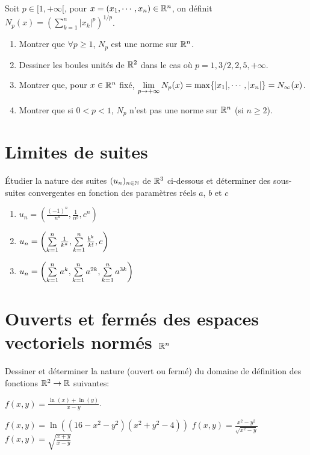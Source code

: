 \documentclass{tp_um}
\begin{document}
\newpage

%
%
Soit $p\in [1,+\infty[$, pour $x=(x_1,\cdots,x_n) \in \mathbb{R}^n$, on définit $N_p(x)=(\sum_{k=1}^n|x_k|^p)^{1/p}$.
\begin{enumerate}
	\item Montrer que $\forall p \geq 1$, $N_p$ est une norme sur $\mathbb{R}^n$.
	\item Dessiner les boules unités de $\mathbb{R}^2$ dans le cas où $p =1,3/2,2, 5,+\infty$.
	\item Montrer que, pour $x\in\mathbb{R}^n$ fixé, $\lim_{p\to+\infty} \limits N_p(x)=\max \{|x_1|,\cdots,\left\lvert x_n\right\rvert\}=N_\infty(x)$.
	\item Montrer que si $0<p<1$, $N_p$ n'est pas une norme sur $\mathbb{R}^n$ (si $n \geq 2$). 
\end{enumerate}


\newpage


\section{Limites de suites}

\exo{} Étudier la nature des suites $(u_{n})_{n\in\mathbb{N}}$ de $\mathbb{R}^3$ ci-dessous et déterminer des sous-suites convergentes en fonction des paramètres réels $a$, $b$ et $c$ 
\begin{enumerate}
	\item $u_n = \left( \frac{(-1)^n}{n^a}, \frac{1}{n^b}, c^n \right)$
	\item $u_n = \left( \sum_{k=1}^n\limits \frac{1}{k^a}, \sum_{k=1}^n\limits \frac{b^k}{k!},c \right)$
	\item $u_n = \left( \sum_{k=1}^n\limits a^k, \sum_{k=1}^n\limits a^{2k},\sum_{k=1}^n\limits a^{3k}  \right) $
\end{enumerate}

\section{Ouverts et fermés des espaces vectoriels normés $\mathbb{R}^n$}


 Dessiner et déterminer la nature (ouvert ou fermé) du domaine de définition des fonctions $\mathbb{R}^2 \to \mathbb{R}$ suivantes:
\begin{multicols}{2}
	\begin{modenumerate}
		\item  $f(x,y)= \frac{\ln(x) + \ln(y)}{x-y}$.
		\item  $f(x,y) = \ln\left( ( 16 -x^2 - y^2)(x^2 + y^2 - 4) \right)$
		\moditem{*}  $f(x,y) = \frac{x^2 - y^2}{\sqrt{x^2 - y}}$
            \moditem{*}  $f(x,y) = \sqrt{\frac{x+y}{x-y}}$
	\end{modenumerate}
\end{multicols}
\bigskip
\newpage
\end{document}
